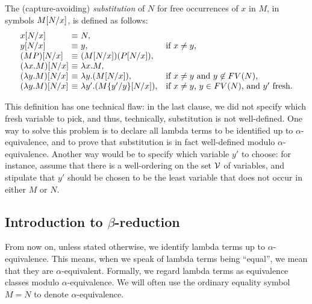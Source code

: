 \documentclass{article}
\begin{document}
\begin{definition}
  The (capture-avoiding) {\em substitution} of $N$ for free
  occurrences of $x$ in $M$, in symbols $M[N/x]$, is defined
  as follows:
  \[  \begin{array}{l@{~}l@{~}ll}
    \subst{x}{N}{x} &\equiv & N, \\
    \subst{y}{N}{x} &\equiv & y, &\mbox{if $x\neq y$,} \\
    \subst{(MP)}{N}{x} &\equiv & (\subst{M}{N}{x})(\subst{P}{N}{x}), \\
    \subst{(\lam x.M)}{N}{x} &\equiv & \lam x.M, \\
    \subst{(\lam y.M)}{N}{x} &\equiv & \lam y.(\subst{M}{N}{x}), 
    &\mbox{if $x\neq y$ and $y\not\in\FV{N}$,} \\
    \subst{(\lam y.M)}{N}{x} &\equiv & \lam y'.(\subst{\ren{M}{y'}{y}}{N}{x}), 
    &\mbox{if $x\neq y$, $y\in\FV{N}$, and $y'$ fresh.} \\
  \end{array}
  \]
\end{definition}

This definition has one technical flaw: in the last clause, we did not
specify which fresh variable to pick, and thus, technically,
substitution is not well-defined. One way to solve this problem is to
declare all lambda terms to be identified up to $\alpha$-equivalence,
and to prove that substitution is in fact well-defined modulo
$\alpha$-equivalence.  Another way would be to specify which variable
$y'$ to choose: for instance, assume that there is a well-ordering on
the set ${\cal V}$ of variables, and stipulate that $y'$ should be chosen
to be the least variable that does not occur in either $M$ or $N$.

\subsection{Introduction to $\beta$-reduction}

\begin{convention}
From now on, unless stated otherwise, we identify lambda terms up to
$\alpha$-equivalence. This means, when we speak of lambda terms being
``equal'', we mean that they are $\alpha$-equivalent. Formally, we
regard lambda terms as equivalence classes modulo $\alpha$-equivalence.
We will often use the ordinary equality symbol $M=N$ to denote
$\alpha$-equivalence. 
\end{convention}
\end{document}
